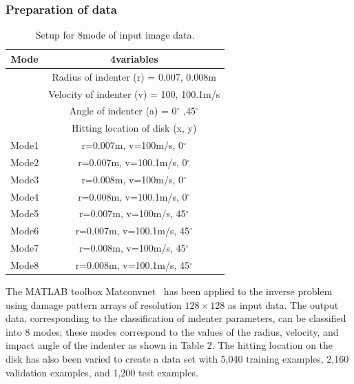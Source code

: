 \subsubsection{Preparation of data}
\label{subsubsec1}
\begin{table}[h!]
\centering
\caption{Setup for 8mode of input image data.}
\label{tab:1}       
\begin{tabular}{c|c}
\hline
\hline
Mode & 4variables \\
\hline
 & Radius of indenter (r) = 0.007, 0.008m \\
 & Velocity of indenter (v) = 100, 100.1m/s \\
 & Angle of indenter (a) = 0$^{\circ}$ ,45$^{\circ}$  \\
 & Hitting location of disk (x, y) \\
 \hline
Mode1 & r=0.007m, v=100m/s, 0$^{\circ}$ \\
Mode2 & r=0.007m, v=100.1m/s, 0$^{\circ}$ \\
Mode3 & r=0.008m, v=100m/s, 0$^{\circ}$ \\
Mode4 & r=0.008m, v=100.1m/s, 0$^{\circ}$ \\
Mode5 & r=0.007m, v=100m/s, 45$^{\circ}$ \\
Mode6 & r=0.007m, v=100.1m/s, 45$^{\circ}$ \\
Mode7 & r=0.008m, v=100m/s, 45$^{\circ}$ \\
Mode8 & r=0.008m, v=100.1m/s, 45$^{\circ}$ \\
\hline
\end{tabular}
\end{table}
The MATLAB toolbox Matconvnet~\cite{Ref22} has been applied to the inverse problem using damage pattern arrays of resolution $128\times128$ as input data.
The output data, corresponding to the classification of indenter parameters, can be classified into 8 modes;
these modes correspond to the values of the radius, velocity, and impact angle of the indenter as shown in Table 2.
The hitting location on the disk has also been varied to create a data set with 5,040 training examples, 2,160 validation examples, and 1,200 test examples.



